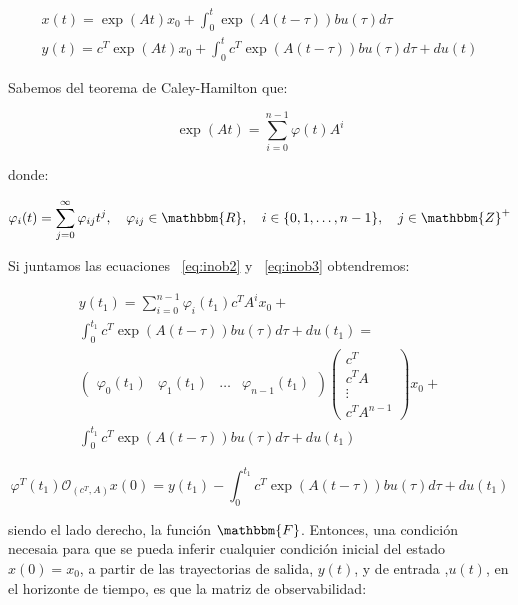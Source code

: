 	    \begin{eqnarray} \label{eq:inob2}
			x(t) = \exp{(At)} x_0 + \int_0^t \exp{\left(A(t - \tau)\right)} b u(\tau) d\tau \nonumber \\
			y(t) = c^T \exp{(At)} x_0 + \int_0^t c^T \exp{\left(A(t - \tau)\right)} b u(\tau) d\tau +d u(t)
		\end{eqnarray}

		Sabemos del teorema de Caley-Hamilton que:

		\begin{equation} \label{eq:inob3}
			\exp{(At)} = \sum_{i=0}^{n-1} \varphi(t) A^i
		\end{equation}

		donde:

		\begin{equation*}
			\varphi_i(t) = \sum_{j=0}^{\infty} \varphi_{ij} t^j, \quad \varphi_{ij} \in \mathbbm{R}, \quad i \in \{ 0, 1, \dots , n-1 \}, \quad j \in \mathbbm{Z}^+
		\end{equation*}

		Si juntamos las ecuaciones ~\ref{eq:inob2} y ~\ref{eq:inob3} obtendremos:

		\begin{multline*}
			y(t_1) = \sum_{i=0}^{n-1} \varphi_i (t_1) c^T A^i x_0 + \\
			\int_0^{t_1} c^T \exp{\left(A(t - \tau)\right)} b u(\tau) d\tau +d u(t_1) = \\
			\begin{pmatrix}
				\varphi_0(t_1) & \varphi_1(t_1) & \dots & \varphi_{n-1}(t_1)
			\end{pmatrix}
			\begin{pmatrix}
				c^T \\
				c^T A \\
				\vdots \\
				c^T A^{n-1}
			\end{pmatrix} x_0 + \\
			\int_0^{t_1} c^T \exp{\left(A(t - \tau)\right)} b u(\tau) d\tau +d u(t_1)
		\end{multline*}

		\begin{equation} \label{eq:inob4}
			\varphi^T(t_1) \mathcal{O}_{(c^T, A)} x(0) = y(t_1) - \int_0^{t_1} c^T \exp{\left(A(t - \tau)\right)} b u(\tau) d\tau +d u(t_1)
		\end{equation}

		siendo el lado derecho, la función $\mathbbm{F}$. Entonces, una condición necesaia para que se pueda inferir cualquier condición inicial del estado $x(0) = x_0$, a partir de las trayectorias de salida, $y(t)$, y de entrada ,$u(t)$, en el horizonte de tiempo, es que la matriz de observabilidad:

